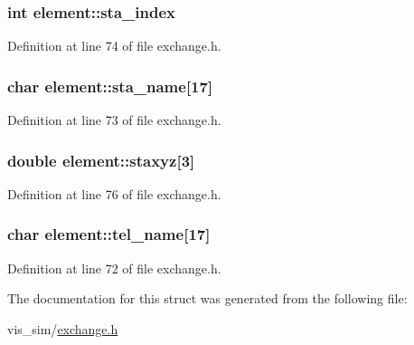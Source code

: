 \hypertarget{structelement_af80efd6ab7b399cfcd749503e064d706}{
\subsubsection[{sta\_\-index}]{\setlength{\rightskip}{0pt plus 5cm}int {\bf element::sta\_\-index}}}
\label{structelement_af80efd6ab7b399cfcd749503e064d706}


Definition at line 74 of file exchange.h.

\hypertarget{structelement_a0b7d84eae2238b598f638d5c1019643a}{
\subsubsection[{sta\_\-name}]{\setlength{\rightskip}{0pt plus 5cm}char {\bf element::sta\_\-name}\mbox{[}17\mbox{]}}}
\label{structelement_a0b7d84eae2238b598f638d5c1019643a}


Definition at line 73 of file exchange.h.

\hypertarget{structelement_a8cac52fbabbe9b450d82e65cfe8974ca}{
\subsubsection[{staxyz}]{\setlength{\rightskip}{0pt plus 5cm}double {\bf element::staxyz}\mbox{[}3\mbox{]}}}
\label{structelement_a8cac52fbabbe9b450d82e65cfe8974ca}


Definition at line 76 of file exchange.h.

\hypertarget{structelement_abc9fbf0bf4d9887fcba546a087043250}{
\subsubsection[{tel\_\-name}]{\setlength{\rightskip}{0pt plus 5cm}char {\bf element::tel\_\-name}\mbox{[}17\mbox{]}}}
\label{structelement_abc9fbf0bf4d9887fcba546a087043250}


Definition at line 72 of file exchange.h.



The documentation for this struct was generated from the following file:\begin{DoxyCompactItemize}
\item 
vis\_\-sim/\hyperlink{exchange_8h}{exchange.h}\end{DoxyCompactItemize}
